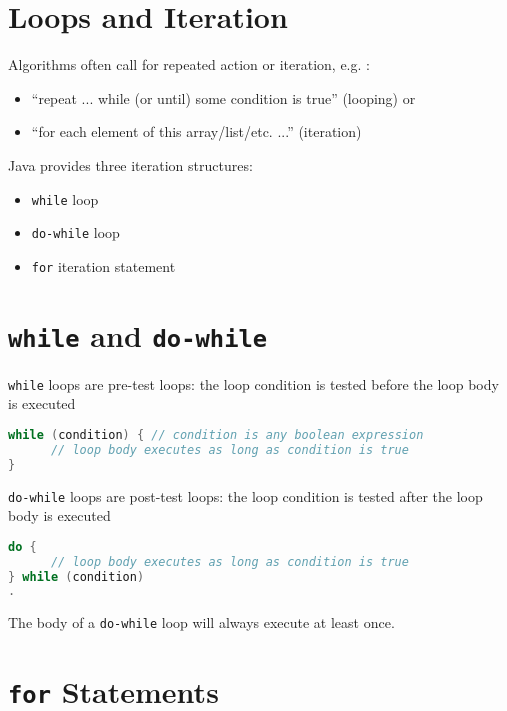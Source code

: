 \documentclass{article}
\begin{document}
\section{Loops and Iteration}


Algorithms often call for repeated action or iteration, e.g. :
\begin{itemize}
\item ``repeat ... while (or until) some condition is true'' (looping) or
\item ``for each element of this array/list/etc. ...'' (iteration)
\end{itemize}

Java provides three iteration structures:
\begin{itemize}
\item {\tt while} loop
\item {\tt do-while} loop
\item {\tt for} iteration statement
\end{itemize}



\section{{\tt while} and {\tt do-while}}

{\tt while} loops are pre-test loops: the loop condition is tested before the loop body is executed
\begin{lstlisting}[language=Java]
while (condition) { // condition is any boolean expression
      // loop body executes as long as condition is true
}
\end{lstlisting}

{\tt do-while} loops are post-test loops: the loop condition is tested after the loop body is executed
\begin{lstlisting}[language=Java]
do {
      // loop body executes as long as condition is true
} while (condition)
.\end{lstlisting}
The body of a {\tt do-while} loop will always execute at least once.


\section{{\tt for} Statements}
\end{document}
